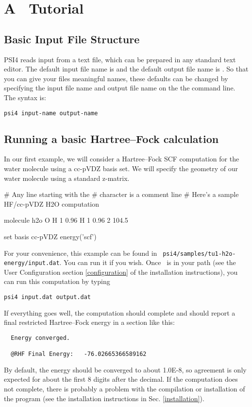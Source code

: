 \section{A \PSIfour\ Tutorial} \label{tutorial}

\subsection{Basic Input File Structure} 

PSI4 reads input from a text file, which can be prepared in any standard
text editor.  The default input file name is  and the
default output file name is .  So that you can give your
files meaningful names, these defaults can be changed by specifying
the input file name and output file name on the the command line.
The syntax is:

{\tt psi4 input-name output-name}

\subsection{Running a basic Hartree--Fock calculation}
In our first example, we will consider a Hartree--Fock SCF computation
for the water molecule using a cc-pVDZ basis set.  We will specify the
geometry of our water molecule using a standard z-matrix.

\begin{Snippet}

# Any line starting with the # character is a comment line
# Here's a sample HF/cc-pVDZ H2O computation

molecule h2o {
  O 
  H 1 0.96
  H 1 0.96 2 104.5
}

set basis cc-pVDZ
energy('scf')
\end{Snippet}

For your convenience, this example can be found in {\tt
psi4/samples/tu1-h2o-energy/input.dat}.  You can run it if you wish.
Once \PSIfour\ is in your path (see the User Configuration section \ref{configuration} of the
installation instructions), you can run this computation by typing
\begin{verbatim}
psi4 input.dat output.dat
\end{verbatim}
If everything goes well, the computation should complete and should report
a final restricted Hartree--Fock energy in a section like this:
\begin{verbatim}
  Energy converged.

  @RHF Final Energy:   -76.02665366589162
\end{verbatim}
By default, the energy should be converged to about 1.0E-8, so agreement
is only expected for about the first 8 digits after the decimal.  If the
computation does not complete, there is probably a problem with the
compilation or installation of the program (see the installation
instructions in Sec. \ref{installation}).


